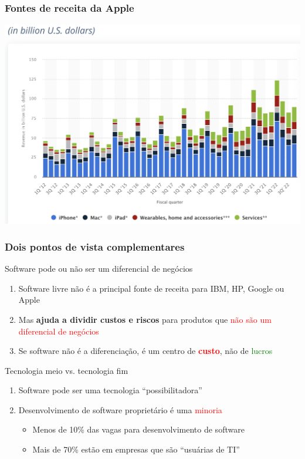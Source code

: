 \documentclass[xcolor=dvipsnames]{beamer}
\newcommand{\tred}[1]{\textcolor{red}{#1}}
\newcommand{\tgreen}[1]{\textcolor{green}{#1}}
\begin{document}
\begin{frame}
	\frametitle{Fontes de receita da Apple}
 	\includegraphics[scale=0.34]{apple_revenue2.png}	
\end{frame}


\begin{frame}
	\frametitle{Dois pontos de vista complementares}
	\begin{block}{Software pode ou não ser um diferencial de negócios}
	\begin{enumerate}
	\item Software livre não é a principal fonte de receita para IBM, HP, Google ou Apple\vspace{0.1cm}
	\item Mas \textbf{ajuda a dividir custos e riscos} para produtos que \tred{não são um diferencial de negócios}\vspace{0.1cm}\pause
	\item Se software não é a diferenciação, é um centro de \textbf{\tred{custo}}, não de \tgreen{lucros}
	\end{enumerate}
	\end{block}
\pause
	\begin{block}{Tecnologia meio vs. tecnologia fim}
	\begin{enumerate}
	\item Software pode ser uma tecnologia ``possibilitadora'' \vspace{0.1cm}
	\item Desenvolvimento de software proprietário é uma \tred{minoria}
	  \begin{itemize}
	  \item Menos de 10\% das vagas para desenvolvimento de software\vspace{0.1cm}
	  \item Mais de 70\% estão em empresas que são ``usuárias de TI''
	  \end{itemize}  
	\end{enumerate}
	\end{block}
\end{frame}
\end{document}
